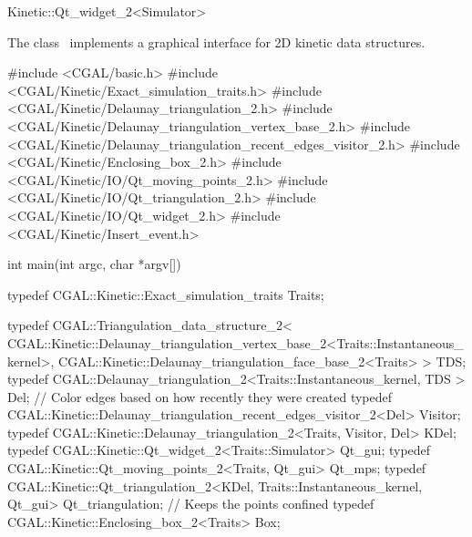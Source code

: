 

\begin{ccRefClass}{Kinetic::Qt_widget_2<Simulator>}  %


\ccDefinition
  
The class \ccRefName\ implements a graphical interface for 2D kinetic data structures.


\ccTypes


\ccCreation
{}  %


\begin{ccExampleCode}
#include <CGAL/basic.h>
#include <CGAL/Kinetic/Exact_simulation_traits.h>
#include <CGAL/Kinetic/Delaunay_triangulation_2.h>
#include <CGAL/Kinetic/Delaunay_triangulation_vertex_base_2.h>
#include <CGAL/Kinetic/Delaunay_triangulation_recent_edges_visitor_2.h>
#include <CGAL/Kinetic/Enclosing_box_2.h>
#include <CGAL/Kinetic/IO/Qt_moving_points_2.h>
#include <CGAL/Kinetic/IO/Qt_triangulation_2.h>
#include <CGAL/Kinetic/IO/Qt_widget_2.h>
#include <CGAL/Kinetic/Insert_event.h>

int main(int argc, char *argv[])
{
  typedef CGAL::Kinetic::Exact_simulation_traits Traits;

 typedef CGAL::Triangulation_data_structure_2<
  CGAL::Kinetic::Delaunay_triangulation_vertex_base_2<Traits::Instantaneous_kernel>,
    CGAL::Kinetic::Delaunay_triangulation_face_base_2<Traits> > TDS;
  typedef CGAL::Delaunay_triangulation_2<Traits::Instantaneous_kernel, TDS > Del;
  // Color edges based on how recently they were created
  typedef CGAL::Kinetic::Delaunay_triangulation_recent_edges_visitor_2<Del> Visitor;
  typedef CGAL::Kinetic::Delaunay_triangulation_2<Traits, Visitor, Del> KDel;
  typedef CGAL::Kinetic::Qt_widget_2<Traits::Simulator> Qt_gui;
  typedef CGAL::Kinetic::Qt_moving_points_2<Traits, Qt_gui> Qt_mps;
  typedef CGAL::Kinetic::Qt_triangulation_2<KDel, Traits::Instantaneous_kernel, Qt_gui> Qt_triangulation;
  // Keeps the points confined
  typedef CGAL::Kinetic::Enclosing_box_2<Traits> Box;

}
\end{ccExampleCode}
\end{ccRefClass}
